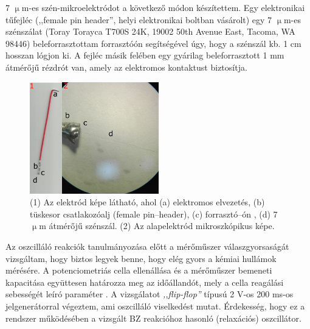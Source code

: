 7 $\upmu$m-es szén-mikroelektródot a következő módon készítettem. Egy elektronikai tűfejléc (,,female pin header'', helyi elektronikai boltban vásárolt) egy 7 $\upmu$m-es szénszálat (Toray Torayca T700S 24K, 19002 50th Avenue East, Tacoma, WA 98446) beleforrasztottam forrasztóón segítségével úgy, hogy a szénszál kb. 1 cm hosszan lógjon ki. A fejléc másik felében egy gyárilag beleforrasztott 1 mm átmérőjű rézdrót van, amely az elektromos kontaktust biztosítja.
\begin{figure}[h]
\centering
\includegraphics[width=0.5\textwidth]{img/szenmikro.png}
\caption{(1) Az elektród képe látható, ahol (a) elektromos elvezetés, (b) tüskesor csatlakozóalj (female pin--header), (c) forrasztó--ón , (d) 7 $\upmu$m átmérőjű szénszál. (2) Az alapelektród mikroszkópikus képe.}
\label{fig:ionophores}
\end{figure}

Az oszcilláló reakciók tanulmányozása előtt a mérőműszer válaszgyorsaságát vizsgáltam, hogy biztos legyek benne, hogy elég gyors a kémiai hullámok mérésére. A potenciometriás cella ellenállása és a mérőműszer bemeneti kapacitása együttesen határozza meg az időállandót, mely a cella reagálási sebességét leíró paraméter \cite{kiss2015deconvolution}. A vizsgálatot \emph{,,flip-flop''} típusú 2 V-os 200 ms-os jelgenerátorral végeztem, ami oszcilláló viselkedést mutat. Érdekesség, hogy ez a rendszer működésében a vizsgált BZ reakcióhoz hasonló (relaxációs) oszcillátor.

